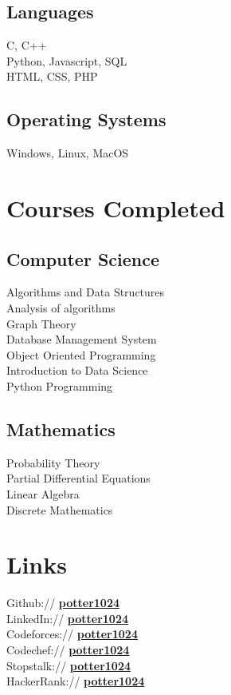 \documentclass[]{deedy-resume-openfont}
\begin{document}
\begin{minipage}[t]{0.33\textwidth}
\subsection{Languages}
C, C++ \\
Python, Javascript, SQL \\
HTML, CSS, PHP
\sectionsep

\subsection{Operating Systems}
Windows, Linux, MacOS


\section{Courses Completed}
\subsection{Computer Science}
Algorithms and Data Structures \\
Analysis of algorithms \\
Graph Theory \\
Database Management System \\
Object Oriented Programming \\
Introduction to Data Science \\
Python Programming
\sectionsep

\subsection{Mathematics}
Probability Theory \\
Partial Differential Equations \\
Linear Algebra\\
Discrete Mathematics

\section{Links} 
Github:// \href{http://www.github.com/potter1024}{\bf potter1024} \\
LinkedIn:// \href{http://www.linkedin.com/in/potter1024}{\bf potter1024} \\
Codeforces:// \href{https://codeforces.com/profile/potter1024}{\bf potter1024} \\
Codechef:// \href{https://www.codechef.com/users/potter1024}{\bf potter1024} \\
Stopstalk:// \href{https://www.stopstalk.com/user/profile/potter1024}{\bf potter1024}\\
HackerRank:// \href{https://www.hackerrank.com/potter1024}{\bf potter1024}\\
%
%

\end{minipage} 
\end{document}
